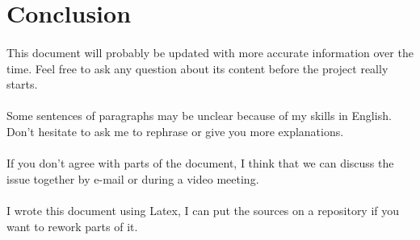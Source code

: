 \section{Conclusion}

\paragraph{} This document will probably be updated with more accurate
information over the time. Feel free to ask any question about its content
before the project really starts.

\paragraph{} Some sentences of paragraphs may be unclear because of my skills in
English. Don't hesitate to ask me to rephrase or give you more explanations.

\paragraph{} If you don't agree with parts of the document, I think that we can
discuss the issue together by e-mail or during a video meeting.

\paragraph{} I wrote this document using Latex, I can put the sources on a
repository if you want to rework parts of it.

